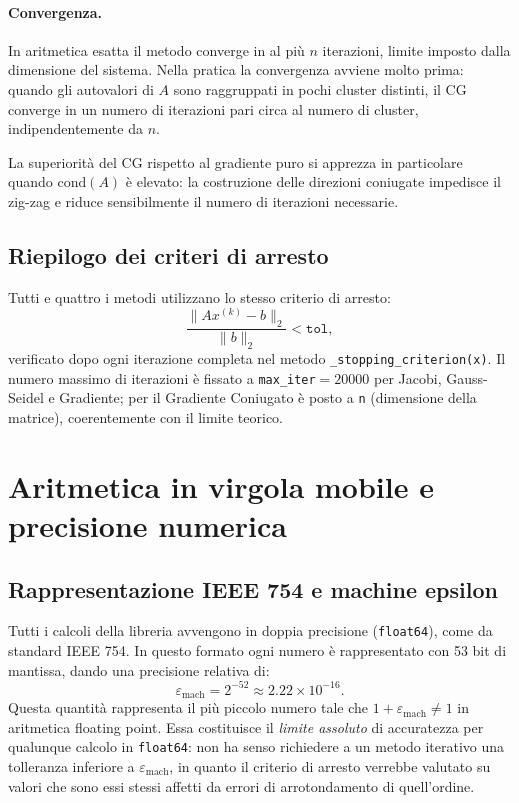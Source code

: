 \documentclass[a4paper,12pt]{article}
\begin{document}
\paragraph{Convergenza.}
In aritmetica esatta il metodo converge in al più $n$ iterazioni, limite
imposto dalla dimensione del sistema. Nella pratica la convergenza avviene
molto prima: quando gli autovalori di $A$ sono raggruppati in pochi cluster
distinti, il CG converge in un numero di iterazioni pari circa al numero di
cluster, indipendentemente da $n$.

La superiorità del CG rispetto al gradiente puro si apprezza in particolare
quando $\mathrm{cond}(A)$ è elevato: la costruzione delle direzioni coniugate
impedisce il zig-zag e riduce sensibilmente il numero di iterazioni necessarie.

\subsection{Riepilogo dei criteri di arresto}
\label{subsec:stop}

Tutti e quattro i metodi utilizzano lo stesso criterio di arresto:
\begin{equation}
    \frac{\|Ax^{(k)} - b\|_2}{\|b\|_2} < \texttt{tol},
\end{equation}
verificato dopo ogni iterazione completa nel metodo
\texttt{\_stopping\_criterion(x)}.
Il numero massimo di iterazioni è fissato a \texttt{max\_iter}$= 20000$ per
Jacobi, Gauss-Seidel e Gradiente; per il Gradiente Coniugato è posto a
\texttt{n} (dimensione della matrice), coerentemente con il limite teorico.

\section{Aritmetica in virgola mobile e precisione numerica}

\subsection{Rappresentazione IEEE 754 e machine epsilon}
Tutti i calcoli della libreria avvengono in doppia precisione (\texttt{float64}), come da standard IEEE 754. In questo formato ogni numero è rappresentato con 53 bit di mantissa, dando una precisione relativa di:
\begin{equation}
    \varepsilon_{\text{mach}} = 2^{-52} \approx 2.22 \times 10^{-16}.
\end{equation}
Questa quantità rappresenta il più piccolo numero tale che $1 + \varepsilon_{\text{mach}} \neq 1$ in aritmetica floating point. Essa costituisce il \emph{limite assoluto} di accuratezza per qualunque calcolo in \texttt{float64}: non ha senso richiedere a un metodo iterativo una tolleranza inferiore a $\varepsilon_{\text{mach}}$, in quanto il criterio di arresto verrebbe valutato su valori che sono essi stessi affetti da errori di arrotondamento di quell'ordine.
\end{document}
